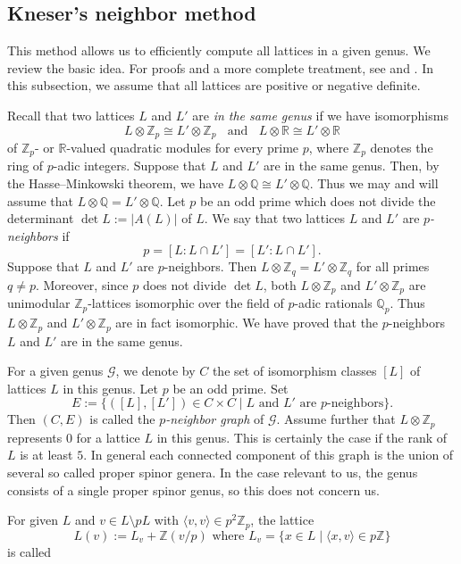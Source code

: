 \documentclass{amsart}
\numberwithin{equation}{section}
\numberwithin{table}{section}
\numberwithin{figure}{section}
\newcommand{\Q}{\mathord{\mathbb  Q}}
\newcommand{\R}{\mathord{\mathbb R}}
\newcommand{\Z}{\mathord{\mathbb Z}}
\newcommand{\intf}[1]{\langle #1 \rangle}
\begin{document}
\subsection{Kneser's neighbor method}
This method allows us to efficiently compute all lattices in a given genus.
We review the basic idea.
For proofs and a more complete treatment, see \cite{kneser} and  \cite{neighbor}.
In this subsection, we assume that 
all lattices are positive or negative definite.
%
\par
Recall that two lattices $L$ and $L'$ are \emph{in the same genus} if
we have isomorphisms
\[
L\otimes \Z_p \cong L'\otimes \Z_p \;\;\mbox{  and  }\;\; L \otimes \R \cong L' \otimes \R
\]
of $\Z_p$- or $\R$-valued quadratic modules for every prime $p$,
where $\Z_p$ denotes the ring of  $p$-adic integers.
Suppose that $L$ and $L'$ are in the same genus.
Then,  by the Hasse--Minkowski theorem, we have  $L \otimes \Q\cong L' \otimes \Q$.
Thus we may and will assume that $L \otimes \Q = L' \otimes \Q$.
Let $p$ be an odd prime  which does not divide the determinant $\det L:=|A(L)|$ of $L$.
We say that two lattices $L$ and $L'$ are \emph{$p$-neighbors} if
\[
p=[L: L \cap L']=[L': L \cap L'].
\]
Suppose that  $L$ and $L'$ are $p$-neighbors.
Then $L \otimes \Z_q = L' \otimes \Z_q$ for all primes $q \neq p$.
Moreover,
since $p$ does not divide $\det L$,
both $L \otimes \Z_p$ and $L' \otimes \Z_p$ are unimodular $\Z_p$-lattices isomorphic over
the field of $p$-adic rationals $\Q_p$.
Thus $L\otimes \Z_p$ and $L' \otimes \Z_p$ are in fact isomorphic.
We have proved that the $p$-neighbors $L$ and $L'$ are in the same genus.
\par
For a given genus $\mathcal{G}$, we denote by $C$ the set of isomorphism classes $[L]$
of lattices $L$ in this genus.
Let $p$ be an odd prime.
Set
\[
E := \{([L],[L']) \in C \times C \mid L \mbox{ and } L' \mbox{ are } p \mbox{-neighbors} \}.
\]
Then $(C,E)$ is called the \emph{$p$-neighbor graph} of $\mathcal{G}$.
Assume further that $L \otimes \Z_p$ represents $0$
for a lattice $L$ in this genus.
This is certainly the case
if the rank of $L$ is at least $5$.
In general each connected component of this graph is
the union of several so called proper spinor genera.
In the case relevant to us,
the genus consists of a single proper spinor genus, so this does not concern us.
\par
For given $L$ and $v \in L \setminus pL$ with $\intf{v,v} \in p^2 \Z_p$,
the lattice
\[
L(v):=L_v + \Z (v/p)\mbox{ where }L_v = \{x \in L \mid \intf{x,v} \in p\Z\}
\]
is called
\end{document}

